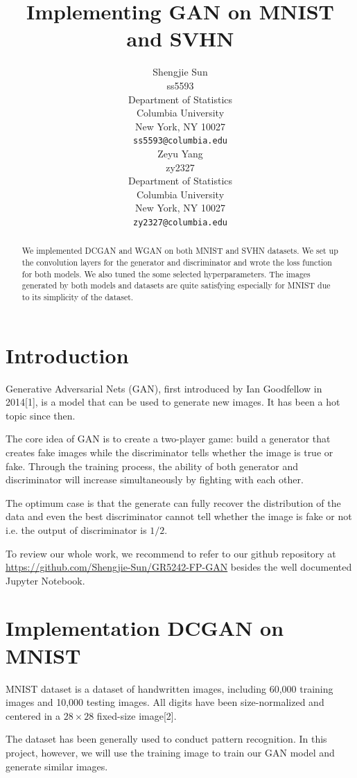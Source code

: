 \documentclass{article}
\title{Implementing GAN on MNIST and SVHN}
\author{%
  Shengjie Sun \\
  ss5593\\
  Department of Statistics\\
  Columbia University\\
  New York, NY 10027 \\
  \texttt{ss5593@columbia.edu} \\
  \And
  Zeyu Yang \\
  zy2327 \\
  Department of Statistics\\
  Columbia University\\
  New York, NY 10027 \\
  \texttt{zy2327@columbia.edu}
}
\begin{document}
\maketitle

\begin{abstract}
  We implemented DCGAN and WGAN on both MNIST and SVHN datasets.
  We set up the convolution layers for the generator and discriminator and wrote the loss function for both models.
  We also tuned the some selected hyperparameters.
  The images generated by both models and datasets are quite satisfying especially for MNIST due to its simplicity of the dataset.
\end{abstract}

\section{Introduction}

Generative Adversarial Nets (GAN), first introduced by Ian Goodfellow in 2014[1], is a model that can be used to generate new images. 
It has been a hot topic since then.

The core idea of GAN is to create a two-player game: build a generator that creates fake images while the discriminator tells whether the image is true or fake. Through the training process, the ability of both generator and discriminator will increase simultaneously by fighting with each other.

The optimum case is that the generate can fully recover the distribution of the data and even the best discriminator cannot tell whether the image is fake or not i.e. the output of discriminator is $1/2$. 

To review our whole work, we recommend to refer to our github repository at \href{https://github.com/Shengjie-Sun/GR5242-FP-GAN}{https://github.com/Shengjie-Sun/GR5242-FP-GAN} besides the well documented Jupyter Notebook.

\section{Implementation DCGAN on MNIST}

MNIST dataset is a dataset of handwritten images, including 60,000 training images and 10,000 testing images.
All digits have been size-normalized and centered in a $28\times 28$ fixed-size image[2].

The dataset has been generally used to conduct pattern recognition. 
In this project, however, we will use the training image to train our GAN model and generate similar images.
\end{document}
